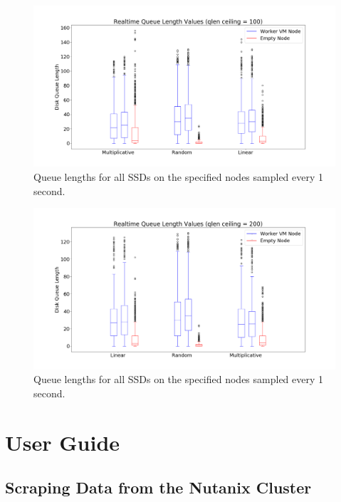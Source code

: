 \documentclass[12pt]{article}
\begin{document}
  \begin{figure}[!htb]
    \centering
    \includegraphics[scale=0.32]{images/qlen_100_box.png} 
    \caption{Queue lengths for all SSDs on the specified nodes sampled every 1
             second.}
    \label{fig:qlen_100}
  \end{figure}

  \begin{figure}[!htb]
    \centering
    \includegraphics[scale=0.32]{images/qlen_200_box.png} 
    \caption{Queue lengths for all SSDs on the specified nodes sampled every 1
             second.}
    \label{fig:qlen_200}
  \end{figure}

\FloatBarrier
\newpage
\null
\section{User Guide}

  \subsection{Scraping Data from the Nutanix Cluster}
\end{document}
